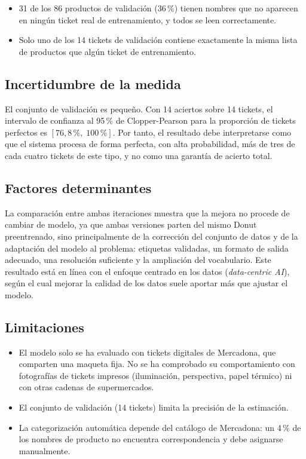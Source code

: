 \begin{itemize}
    \item 31 de los 86 productos de validación (36\,\%) tienen nombres que no aparecen en ningún ticket real de entrenamiento, y todos se leen correctamente.
    \item Solo uno de los 14 tickets de validación contiene exactamente la misma lista de productos que algún ticket de entrenamiento.
\end{itemize}

\subsection{Incertidumbre de la medida}
El conjunto de validación es pequeño. Con 14 aciertos sobre 14 tickets, el intervalo de confianza al 95\,\% de Clopper-Pearson para la proporción de tickets perfectos es $[76{,}8\,\%,\;100\,\%]$. Por tanto, el resultado debe interpretarse como que el sistema procesa de forma perfecta, con alta probabilidad, más de tres de cada cuatro tickets de este tipo, y no como una garantía de acierto total.

\subsection{Factores determinantes}
La comparación entre ambas iteraciones muestra que la mejora no procede de cambiar de modelo, ya que ambas versiones parten del mismo Donut preentrenado, sino principalmente de la corrección del conjunto de datos y de la adaptación del modelo al problema: etiquetas validadas, un formato de salida adecuado, una resolución suficiente y la ampliación del vocabulario. Este resultado está en línea con el enfoque centrado en los datos (\textit{data-centric AI}), según el cual mejorar la calidad de los datos suele aportar más que ajustar el modelo.

\subsection{Limitaciones}
\begin{itemize}
    \item El modelo solo se ha evaluado con tickets digitales de Mercadona, que comparten una maqueta fija. No se ha comprobado su comportamiento con fotografías de tickets impresos (iluminación, perspectiva, papel térmico) ni con otras cadenas de supermercados.
    \item El conjunto de validación (14 tickets) limita la precisión de la estimación.
    \item La categorización automática depende del catálogo de Mercadona: un 4\,\% de los nombres de producto no encuentra correspondencia y debe asignarse manualmente.
\end{itemize}
